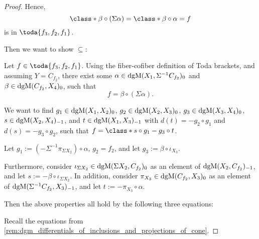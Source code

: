 \begin{proof}
    Hence,
    \[
        \class*{\beta \circ (\Sigma \alpha)} = \class*{\beta \circ \alpha} = f
    \]
    is in \( \toda{f_3, f_2, f_1} \).

    Then we want to show \( \subseteq \):

    Let \( f \in \toda{f_3, f_2, f_1} \). Using the fiber-cofiber definition of Toda brackets, and assuming \( Y = C_{f_2} \), there exist some \( \alpha \in \operatorname{dgM}(X_1, \Sigma^{-1} C_{f_2})_0 \) and \( \beta \in \operatorname{dgM}(C_{f_2}, X_4)_0 \), such that
    \[
        f = \beta \circ (\Sigma \alpha).
    \]

    We want to find \( g_1 \in \operatorname{dgM}(X_1, X_2)_0 \), \( g_2 \in \operatorname{dgM}(X_2, X_3)_0 \), \( g_3 \in \operatorname{dgM}(X_3, X_4)_0 \), \( s \in \operatorname{dgM}(X_2, X_4)_{-1} \), and \( t \in \operatorname{dgM}(X_1, X_3)_{-1} \) with \( d(t) = - g_2 \circ g_1 \) and \( d(s) = -g_3 \circ g_2 \), such that \( f = \class*{s \circ g_1 - g_3 \circ t} \).

    Let \( g_1 := (-\Sigma^{-1} \pi_{\Sigma X_2}) \circ \alpha \), \( g_2 = f_2 \), and let \( g_3 := \beta \circ \iota_{X_3} \). 

    Furthermore, consider \( \iota_{\Sigma X_2} \in \operatorname{dgM}(\Sigma X_2, C_{f_2})_0 \) as an element of \( \operatorname{dgM}(X_2, C_{f_2})_{-1} \), and let \( s := - \beta \circ \iota_{\Sigma X_2} \). In addition, consider \( \pi_{X_3} \in \operatorname{dgM}(C_{f_2}, X_3)_0 \) as an element of \( \operatorname{dgM}(\Sigma^{-1} C_{f_2}, X_3)_{-1} \), and let \( t := - \pi_{X_3} \circ \alpha \).

    Then the above properties all hold by the following three equations:

    Recall the equations from \autoref{rem:dgm_differentials_of_inclusions_and_projections_of_cone}.


\end{proof}
